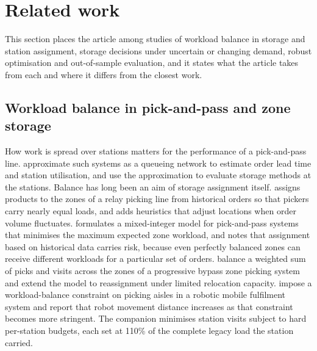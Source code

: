 \section{Related work}\label{sec:related}
This section places the article among studies of workload balance in storage and station assignment, storage decisions under uncertain or changing demand, robust optimisation and out-of-sample evaluation, and it states what the article takes from each and where it differs from the closest work.

\subsection{Workload balance in pick-and-pass and zone storage}\label{subsec:rw_balance}
How work is spread over stations matters for the performance of a pick-and-pass line. \citet{yu2008pickandpass} approximate such systems as a queueing network to estimate order lead time and station utilisation, and use the approximation to evaluate storage methods at the stations. Balance has long been an aim of storage assignment itself. \citet{jane2000storage} assigns products to the zones of a relay picking line from historical orders so that pickers carry nearly equal loads, and adds heuristics that adjust locations when order volume fluctuates. \citet{tarczynski2023} formulates a mixed-integer model for pick-and-pass systems that minimises the maximum expected zone workload, and notes that assignment based on historical data carries risk, because even perfectly balanced zones can receive different workloads for a particular set of orders. \citet{kim2022dynamic} balance a weighted sum of picks and visits across the zones of a progressive bypass zone picking system and extend the model to reassignment under limited relocation capacity. \citet{zhang2024joint} impose a workload-balance constraint on picking aisles in a robotic mobile fulfilment system and report that robot movement distance increases as that constraint becomes more stringent. The companion \citep{belul_companion} minimises station visits subject to hard per-station budgets, each set at 110\% of the complete legacy load the station carried.

